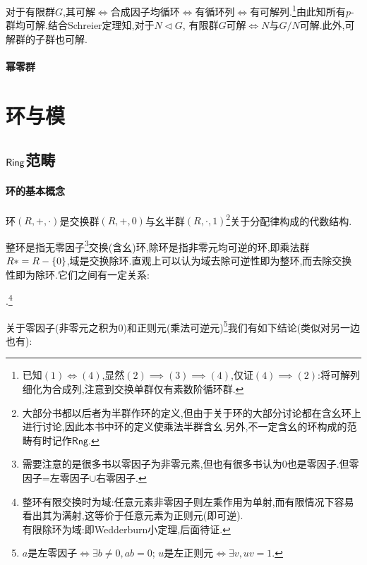 \documentclass[11pt]{article} %
\begin{document}
对于有限群$G$,其可解$\iff$合成因子均循环$\iff$有循环列$\iff$有可解列.\footnote{已知$(1)\iff (4)$,显然$(2)\implies (3)\implies (4)$,仅证$(4)\implies (2)$:将可解列细化为合成列,注意到交换单群仅有素数阶循环群.}由此知所有$p$-群均可解.结合Schreier定理知,对于$N\lhd G$, 有限群$G$可解$\iff N$与$G/N$可解.此外,可解群的子群也可解.

\paragraph{幂零群}

\newpage
\section{环与模}
\subsection{$\mathsf{Ring}$范畴}
\paragraph{环的基本概念}
环$(R,+,\cdot)$是交换群$(R,+,0)$与幺半群$(R,\cdot,1)$\footnote{大部分书都以后者为半群作环的定义,但由于关于环的大部分讨论都在含幺环上进行讨论,因此本书中环的定义使乘法半群含幺.另外,不一定含幺的环构成的范畴有时记作$\mathsf{Rng}$.}关于分配律构成的代数结构.

整环是指无零因子\footnote{需要注意的是很多书以零因子为非零元素,但也有很多书认为0也是零因子.但零因子=左零因子$\cup$右零因子.}交换(含幺)环,除环是指非零元均可逆的环,即乘法群$R*=R-\left\{0\right\}$,域是交换除环.直观上可以认为域去除可逆性即为整环,而去除交换性即为除环.它们之间有一定关系:
.\footnote{整环有限交换时为域:任意元素非零因子则左乘作用为单射,而有限情况下容易看出其为满射,这等价于任意元素为正则元(即可逆).\\ 有限除环为域:即Wedderburn小定理,后面待证.}

关于零因子(非零元之积为0)和正则元(乘法可逆元)\footnote{$a$是左零因子$\iff \exists b\neq 0, ab=0$; $u$是左正则元$\iff \exists v, uv=1$.}我们有如下结论(类似对另一边也有):

\end{document}
